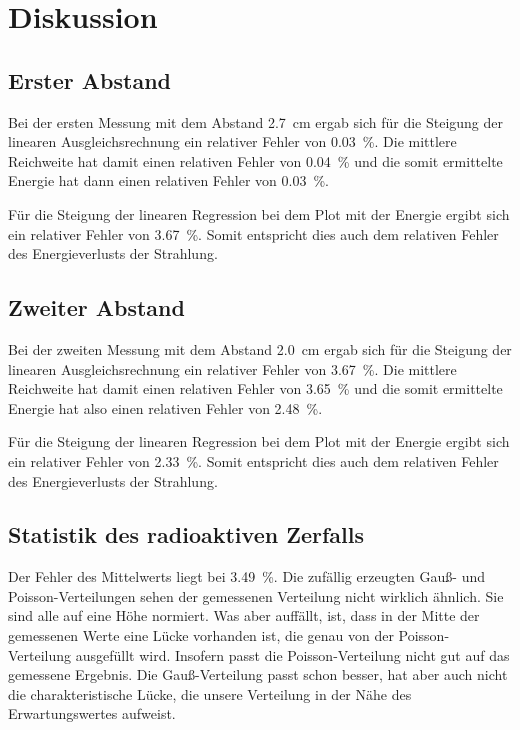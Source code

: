 \section{Diskussion}
\label{sec:Diskussion}

\subsection{Erster Abstand}

Bei der ersten Messung mit dem Abstand \SI{2.7}{\centi\meter} ergab sich für die Steigung der linearen Ausgleichsrechnung ein relativer Fehler von \SI{0.03}{\percent}. Die mittlere Reichweite hat damit einen relativen Fehler von \SI{0.04}{\percent } und die somit ermittelte Energie hat dann einen relativen Fehler von \SI{0.03}{\percent}. 

\noindent Für die Steigung der linearen Regression bei dem Plot mit der Energie ergibt sich ein relativer Fehler von \SI{3.67}{\percent}. Somit entspricht dies auch dem relativen Fehler des Energieverlusts der Strahlung. 

\subsection{Zweiter Abstand}

Bei der zweiten Messung mit dem Abstand \SI{2.0}{\centi\meter} ergab sich für die Steigung der linearen Ausgleichsrechnung ein relativer Fehler von \SI{3.67}{\percent}. Die mittlere Reichweite hat damit einen relativen Fehler von \SI{3.65}{\percent } und die somit ermittelte Energie hat also einen relativen Fehler von \SI{2.48}{\percent}. 

\noindent Für die Steigung der linearen Regression bei dem Plot mit der Energie ergibt sich ein relativer Fehler von \SI{2.33}{\percent}. Somit entspricht dies auch dem relativen Fehler des Energieverlusts der Strahlung. 

\subsection{Statistik des radioaktiven Zerfalls}

Der Fehler des Mittelwerts liegt bei \SI{3.49}{\percent}. 
Die zufällig erzeugten Gauß- und Poisson-Verteilungen sehen der gemessenen Verteilung nicht wirklich ähnlich. Sie sind alle auf eine Höhe normiert. Was aber auffällt, ist, dass in der Mitte der gemessenen Werte eine Lücke vorhanden ist, die genau von der Poisson-Verteilung ausgefüllt wird. Insofern passt die Poisson-Verteilung nicht gut auf das gemessene Ergebnis. Die Gauß-Verteilung passt schon besser, hat aber auch nicht die charakteristische Lücke, die unsere Verteilung in der Nähe des Erwartungswertes aufweist. 
